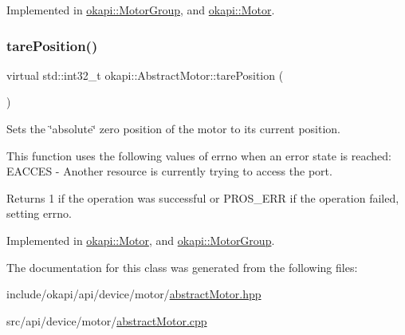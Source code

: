 Implemented in \mbox{\hyperlink{classokapi_1_1MotorGroup_a1ccc0bc9af94c6bab28f2373a902b23a}{okapi\+::\+Motor\+Group}}, and \mbox{\hyperlink{classokapi_1_1Motor_a5aab4b416675b7f7ee324fff4d8cda30}{okapi\+::\+Motor}}.

\mbox{\label{classokapi_1_1AbstractMotor_ac36edbc92db85a11adcfee56275de15b}} 
\subsubsection{\texorpdfstring{tarePosition()}{tarePosition()}}
{\footnotesize\ttfamily virtual std\+::int32\+\_\+t okapi\+::\+Abstract\+Motor\+::tare\+Position (\begin{DoxyParamCaption}{ }\end{DoxyParamCaption})\hspace{0.3cm}{\ttfamily [pure virtual]}}

Sets the \char`\"{}absolute\char`\"{} zero position of the motor to its current position.

This function uses the following values of errno when an error state is reached\+: E\+A\+C\+C\+ES -\/ Another resource is currently trying to access the port.

\begin{DoxyReturn}{Returns}
1 if the operation was successful or P\+R\+O\+S\+\_\+\+E\+RR if the operation failed, setting errno. 
\end{DoxyReturn}


Implemented in \mbox{\hyperlink{classokapi_1_1Motor_aa71f3d93b734caec5c9245b211d4a0ad}{okapi\+::\+Motor}}, and \mbox{\hyperlink{classokapi_1_1MotorGroup_a59aef8ea3c212e3466b67631978e47eb}{okapi\+::\+Motor\+Group}}.



The documentation for this class was generated from the following files\+:\begin{DoxyCompactItemize}
\item 
include/okapi/api/device/motor/\mbox{\hyperlink{abstractMotor_8hpp}{abstract\+Motor.\+hpp}}\item 
src/api/device/motor/\mbox{\hyperlink{abstractMotor_8cpp}{abstract\+Motor.\+cpp}}\end{DoxyCompactItemize}
